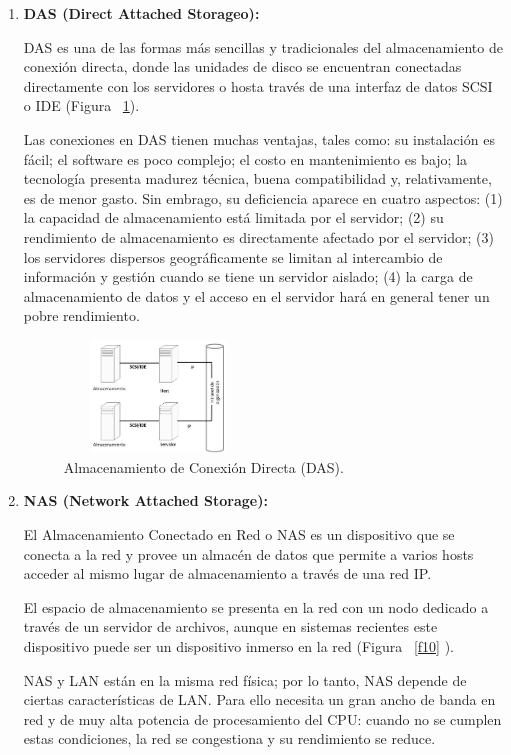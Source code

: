 \documentclass[10pt,journal]{IEEEtran}
\begin{document}
\begin{enumerate}[1.]
    \item \textbf{DAS (Direct Attached Storageo):} \par
    DAS es una de las formas más sencillas y tradicionales del almacenamiento de conexión directa, donde las unidades de disco se encuentran conectadas directamente con los servidores o hosta través de una interfaz de datos SCSI o IDE (Figura ~\ref{f9}). \par Las conexiones en DAS tienen muchas ventajas, tales como: su instalación es fácil; el software es poco complejo; el costo en mantenimiento es bajo; la tecnología presenta madurez técnica, buena compatibilidad y, relativamente, es de menor gasto. Sin embrago, su deficiencia aparece en cuatro aspectos: (1) la capacidad de almacenamiento está limitada por el servidor; (2) su rendimiento de almacenamiento es directamente afectado por el servidor; (3) los servidores dispersos geográficamente se limitan al intercambio de información y gestión cuando se tiene un servidor aislado; (4) la carga de almacenamiento de datos y el acceso en el servidor hará en general tener un pobre rendimiento.
    \begin{figure}[H]
        \begin{center}
            \includegraphics[width=5cm, height=3cm]{figuras/DAS.JPG}
             \caption{Almacenamiento de Conexión Directa (DAS).\citep{vazquez}}
             \label{f9} 
        \end{center}
    \end{figure}
    \item \textbf{NAS (Network Attached Storage):} \par
    El Almacenamiento Conectado en Red o NAS es un dispositivo que se conecta a la red y provee un almacén de datos que permite a varios hosts acceder al mismo lugar de almacenamiento a través de una red IP.\par El espacio de almacenamiento se presenta en la red con un nodo dedicado a través de un servidor de archivos, aunque en sistemas recientes este dispositivo puede ser un dispositivo inmerso en la red (Figura ~\ref{f10} ).\par NAS y LAN están en la misma red física; por lo tanto, NAS depende de ciertas características de LAN. Para ello necesita un gran ancho de banda en red y de muy alta potencia de procesamiento del CPU: cuando no se cumplen estas condiciones, la red se congestiona y su rendimiento se reduce.

\end{enumerate}
\end{document}
